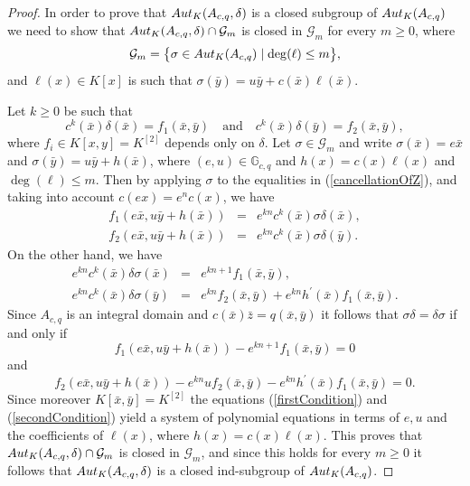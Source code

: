 \documentclass[10pt,a4paper]{amsart}
\newcommand \G {\mathbb{G}}
\newcommand \auto {{\rm Aut}}
\renewcommand \a {A}
\renewcommand \k {K}
\begin{document}
\begin{proof}In order to prove that $\auto_{\k}(\a_{c,q},\delta)$ is a closed subgroup of $\auto_{\k}(\a_{c,q})$ we need to show that $\auto_{\k}(\a_{c,q},\delta)\cap \mathcal{G}_m$ is closed in $\mathcal{G}_m$ for every $m\geq 0$, where $$\mathcal{G}_m=\big\{ \sigma\in\auto_{\k}(\a_{c,q})\mid \deg(\ell)\leq m\big\},$$ and $\ell(x)\in\k[x]$ is such that $\sigma(\bar{y})=u\bar{y}+c(\bar{x})\ell(\bar{x})$.
	
	\medskip Let $k\geq 0$ be such that \begin{equation}\label{cancellationOfZ}c^{k}(\bar{x})\delta(\bar{x})=f_1(\bar{x},\bar{y}) \quad \text{and} \quad c^{k}(\bar{x})\delta(\bar{y})=f_2(\bar{x},\bar{y}),\end{equation} where $f_i\in \k[x,y]=K^{[2]}$ depends only on $\delta$. Let $\sigma\in\mathcal{G}_m$ and write $\sigma(\bar{x})=e\bar{x}$ and $\sigma(\bar{y})=u\bar{y}+h(\bar{x})$, where $(e,u)\in\G_{c,q}$ and $h(x)=c(x)\ell(x)$ and $\deg(\ell)\leq m$. Then by applying $\sigma$ to the equalities in (\ref{cancellationOfZ}), and taking into account $c(ex)=e^nc(x)$, we have $$\begin{array}{ccc}f_1(e\bar{x},u\bar{y}+h(\bar{x}))&=&
		e^{kn}c^k(\bar{x})\sigma\delta(\bar{x}),\\
		f_2(e\bar{x},u\bar{y}+h(\bar{x}))&=&e^{kn}c^k(\bar{x})\sigma\delta(\bar{y}).\end{array}$$
	On the other hand, we have
	$$\begin{array}{ccc}
		e^{kn}c^k(\bar{x})\delta\sigma(\bar{x})&=&e^{kn+1}f_1(\bar{x},\bar{y}),\\
		e^{kn}c^k(\bar{x})\delta\sigma(\bar{y})&=&e^{kn}f_2(\bar{x},\bar{y})+e^{kn}h^{\prime}(\bar{x})f_1(\bar{x},\bar{y}).
	\end{array}$$
	Since $\a_{c,q}$ is an integral domain and $c(\bar{x})\bar{z}=q(\bar{x},\bar{y})$ it follows that $\sigma\delta=\delta\sigma$ if and only if
	\begin{equation}\label{firstCondition}f_1(e\bar{x},u\bar{y}+h(\bar{x}))-e^{kn+1}f_1(\bar{x},\bar{y})=0
	\end{equation}
	and
	\begin{equation}\label{secondCondition}f_2(e\bar{x},u\bar{y}+h(\bar{x}))-e^{kn}uf_2(\bar{x},\bar{y})-e^{kn}h^{\prime}(\bar{x})f_1(\bar{x},\bar{y})=0.
	\end{equation}
	Since moreover $\k[\bar{x},\bar{y}]=\k^{[2]}$ the equations (\ref{firstCondition}) and (\ref{secondCondition}) yield a system of polynomial equations in terms of $e,u$ and the coefficients of $\ell(x)$, where $h(x)=c(x)\ell(x)$. This proves that $\auto_{\k}(\a_{c,q},\delta)\cap \mathcal{G}_m$ is closed in $\mathcal{G}_m$, and since this holds for every $m\geq 0$ it follows that $\auto_{\k}(\a_{c,q},\delta)$ is a closed ind-subgroup of $\auto_{\k}(\a_{c,q})$.
	

\end{proof}
\end{document}
